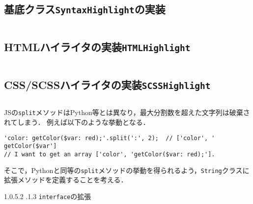 \documentclass[autodetect-engine,dvi=dvipdfmx,ja=standard,
               a4j,11pt]{bxjsarticle}
\makeatletter
\renewcommand{\paragraph}{\@startsection{paragraph}{4}{\z@}%
  {1.0\Cvs \@plus.5\Cdp \@minus.2\Cdp}%
  {.1\Cvs \@plus.3\Cdp}%
  {\reset@font\sffamily\normalsize}
}
\makeatother
\begin{document}
\subsection{基底クラス{\tt SyntaxHighlight}の実装}

\begin{lstlisting}[caption={ハイライタ基底クラス({\tt base.ts})}, label={prog:base}]

\end{lstlisting}




\subsection{HTMLハイライタの実装{\tt HTMLHighlight}}

\begin{lstlisting}[caption={HTMLハイライタ({\tt html.ts})}, label={prog:html}]

\end{lstlisting}






\subsection{CSS/SCSSハイライタの実装{\tt SCSSHighlight}}

\begin{lstlisting}[caption={CSS/SCSSハイライタ({\tt scss.ts})}, label={prog:scss}]

\end{lstlisting}





JSの\verb|split|メソッドはPython等とは異なり，最大分割数を超えた文字列は破棄されてしまう．
例えば以下のような挙動となる．

\begin{Verbatim}[numbers=none, xleftmargin=8mm, numbersep=6pt, fontsize=\small, baselinestretch=0.8]
'color: getColor($var: red);'.split(':', 2);  // ['color', ' getColor($var']
// I want to get an array ['color', 'getColor($var: red);'].
\end{Verbatim}

そこで，Pythonと同等の\verb|split|メソッドの挙動を得られるよう，\verb|String|クラスに拡張メソッドを定義することを考える．

\paragraph{{\tt interface}の拡張}
\end{document}
